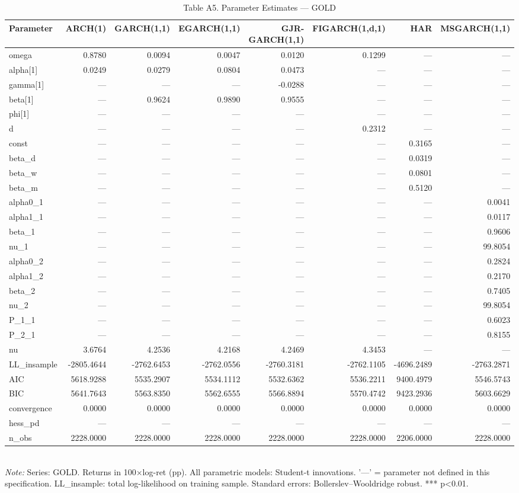 \begin{table}[ht]
\centering
\caption{Table A5. Parameter Estimates — GOLD}
\label{tab:est_gold}
\begin{tabular}{lrrrrrrr}
\toprule
Parameter & ARCH(1) & GARCH(1,1) & EGARCH(1,1) & GJR-GARCH(1,1) & FIGARCH(1,d,1) & HAR & MSGARCH(1,1) \\
\midrule
omega & 0.8780 & 0.0094 & 0.0047 & 0.0120 & 0.1299 & — & — \\
alpha[1] & 0.0249 & 0.0279 & 0.0804 & 0.0473 & — & — & — \\
gamma[1] & — & — & — & -0.0288 & — & — & — \\
beta[1] & — & 0.9624 & 0.9890 & 0.9555 & — & — & — \\
phi[1] & — & — & — & — & — & — & — \\
d & — & — & — & — & 0.2312 & — & — \\
const & — & — & — & — & — & 0.3165 & — \\
beta_d & — & — & — & — & — & 0.0319 & — \\
beta_w & — & — & — & — & — & 0.0801 & — \\
beta_m & — & — & — & — & — & 0.5120 & — \\
alpha0_1 & — & — & — & — & — & — & 0.0041 \\
alpha1_1 & — & — & — & — & — & — & 0.0117 \\
beta_1 & — & — & — & — & — & — & 0.9606 \\
nu_1 & — & — & — & — & — & — & 99.8054 \\
alpha0_2 & — & — & — & — & — & — & 0.2824 \\
alpha1_2 & — & — & — & — & — & — & 0.2170 \\
beta_2 & — & — & — & — & — & — & 0.7405 \\
nu_2 & — & — & — & — & — & — & 99.8054 \\
P_1_1 & — & — & — & — & — & — & 0.6023 \\
P_2_1 & — & — & — & — & — & — & 0.8155 \\
nu & 3.6764 & 4.2536 & 4.2168 & 4.2469 & 4.3453 & — & — \\
LL_insample & -2805.4644 & -2762.6453 & -2762.0556 & -2760.3181 & -2762.1105 & -4696.2489 & -2763.2871 \\
AIC & 5618.9288 & 5535.2907 & 5534.1112 & 5532.6362 & 5536.2211 & 9400.4979 & 5546.5743 \\
BIC & 5641.7643 & 5563.8350 & 5562.6555 & 5566.8894 & 5570.4742 & 9423.2936 & 5603.6629 \\
convergence & 0.0000 & 0.0000 & 0.0000 & 0.0000 & 0.0000 & 0.0000 & 0.0000 \\
hess_pd & — & — & — & — & — & — & — \\
n_obs & 2228.0000 & 2228.0000 & 2228.0000 & 2228.0000 & 2228.0000 & 2206.0000 & 2228.0000 \\
\bottomrule
\end{tabular}
\\[3pt]\footnotesize\textit{Note:} Series: GOLD. Returns in 100×log-ret (pp). All parametric models: Student-t innovations. '—' = parameter not defined in this specification. LL_insample: total log-likelihood on training sample. Standard errors: Bollerslev–Wooldridge robust. *** p<0.01.
\end{table}